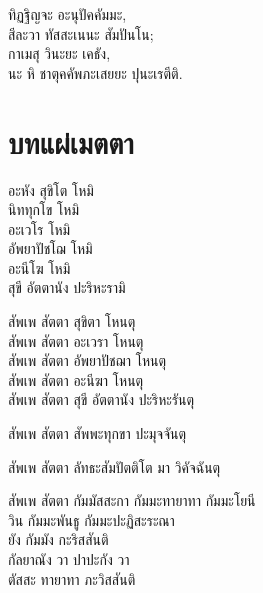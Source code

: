 ทิฏฐิญจะ อะนุปัคคัมมะ,\\
สีละวา ทัสสะเนนะ สัมปันโน;\\
กาเมสุ วินะยะ เคธัง,\\
นะ หิ ชาตุคคัพภะเสยยะ ปุนะเรตีติ.

\chapter[แผ่เมตตา]{บทแผ่เมตตา}


อะหัง สุขิโต โหมิ\\
นิททุกโข โหมิ\\
อะเวโร โหมิ\\
อัพยาปัชโฌ โหมิ\\
อะนีโฆ โหมิ\\
สุขี อัตตานัง ปะริหะรามิ

สัพเพ สัตตา สุขิตา โหนตุ\\
สัพเพ สัตตา อะเวรา โหนตุ\\
สัพเพ สัตตา อัพยาปัชฌา โหนตุ\\
สัพเพ สัตตา อะนีฆา โหนตุ\\
สัพเพ สัตตา สุขี อัตตานัง ปะริหะรันตุ

สัพเพ สัตตา สัพพะทุกขา ปะมุจจันตุ

สัพเพ สัตตา ลัทธะสัมปัตติโต มา วิคัจฉันตุ

สัพเพ สัตตา กัมมัสสะกา กัมมะทายาทา กัมมะโยนี\\
วิน กัมมะพันธู กัมมะปะฏิสะระณา\\
ยัง กัมมัง กะริสสันติ\\
กัลยาณัง วา ปาปะกัง วา\\
ตัสสะ ทายาทา ภะวิสสันติ

